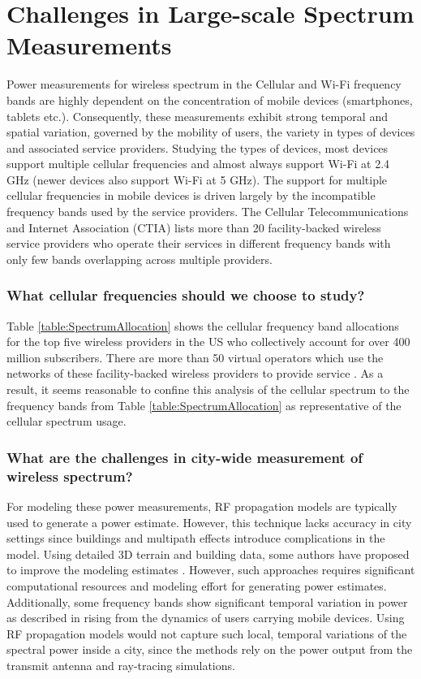 
\section{Challenges in Large-scale Spectrum Measurements}

Power measurements for wireless spectrum in the Cellular and Wi-Fi frequency bands are highly dependent on the concentration of mobile devices (smartphones, tablets etc.).
 Consequently, these measurements exhibit strong temporal and spatial variation, governed by the mobility of users, the variety in types of devices and associated service providers.
 Studying the types of devices, most devices support multiple cellular frequencies and almost always support Wi-Fi at 2.4 GHz (newer devices also support Wi-Fi at 5 GHz).
 The support for multiple cellular frequencies in mobile devices is driven largely by the incompatible frequency bands used by the service providers.
 The Cellular Telecommunications and Internet Association (CTIA) \cite{CTIA} \cite{wiki:LTEBands} lists more than 20 facility-backed wireless service providers who operate their services in different frequency bands with only few bands overlapping across multiple providers.

\subsubsection{What cellular frequencies should we choose to study?} \label{subsubsec:whatfreq}
Table \ref{table:SpectrumAllocation} shows the cellular frequency band allocations for the top five wireless providers in the US who collectively account for over 400 million subscribers.
 There are more than 50 virtual operators which use the networks of these facility-backed wireless providers to provide service \cite{wiki:LTEBands}.
 As a result, it seems reasonable to confine this analysis of the cellular spectrum to the frequency bands from Table \ref{table:SpectrumAllocation} as representative of the cellular spectrum usage.
 


\subsubsection{What are the challenges in city-wide measurement of wireless spectrum?}
For modeling these power measurements, RF propagation models are typically used to generate a power estimate.
 However, this technique lacks accuracy in city settings since buildings and multipath effects introduce complications in the model.
 Using detailed 3D terrain and building data, some authors have proposed to improve the modeling estimates \cite{RFModelsCity1} \cite{RFModelsCity2}.
 However, such approaches requires significant computational resources and modeling effort for generating power estimates.
 Additionally, some frequency bands show significant temporal variation in power as described in \cite{SpectrumDynamics} rising from the dynamics of users carrying mobile devices.
 Using RF propagation models would not capture such local, temporal variations of the spectral power inside a city, since the methods rely on the power output from the transmit antenna and ray-tracing simulations.


